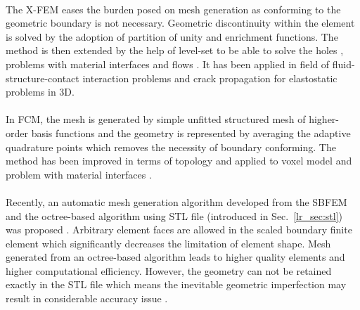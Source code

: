 \paragraph{}
The X-FEM eases the burden posed on mesh generation as conforming to the geometric boundary is not necessary.
Geometric discontinuity within the element is solved by the adoption of partition of unity \citep{MELENK1996289} and enrichment functions.
The method is then extended by the help of level-set \citep{OSHER198812} to be able to solve the holes \citep{Sukumar2001}, problems with material interfaces \citep{doi:10.1002/nme.2259} and flows \citep{Chessa2003}.
It has been applied in field of fluid-structure-contact interaction problems \citep{Mayer2010} and crack propagation for elastostatic problems \citep{doi:10.1002/nme.429,doi:10.1002/nme.430} in 3D.

\paragraph{}
In FCM, the mesh is generated by simple unfitted structured mesh of higher-order basis functions and the geometry is represented by averaging the adaptive quadrature points which removes the necessity of boundary conforming.
The method has been improved in terms of topology \citep{Parvizian2012} and applied to voxel model \citep{doi:10.1002/nme.3289} and problem with material interfaces \citep{Joulaian2013}.

\paragraph{}
Recently, an automatic mesh generation algorithm developed from the SBFEM and the octree-based algorithm using STL file (introduced in Sec.~\ref{lr_sec:stl}) was proposed \citep{Liu2017}.
Arbitrary element faces are allowed in the scaled boundary finite element which significantly decreases the limitation of element shape.
Mesh generated from an octree-based algorithm leads to higher quality elements and higher computational efficiency.
However, the geometry can not be retained exactly in the STL file which means the inevitable geometric imperfection may result in considerable accuracy issue \citep{Hug2005}.

